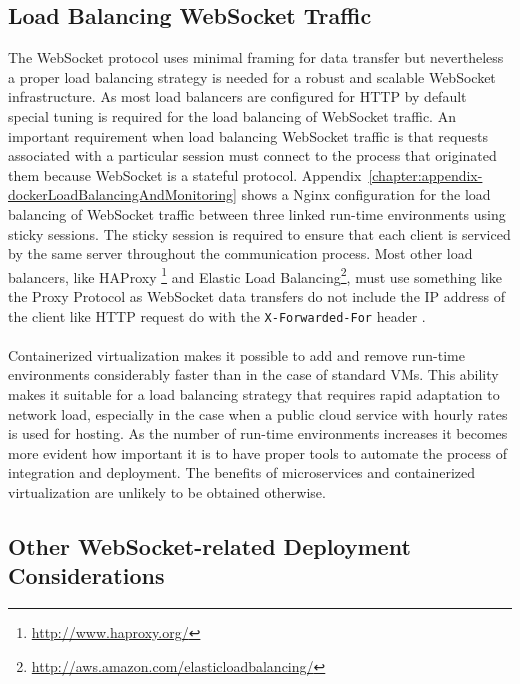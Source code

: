 \subsection{Load Balancing WebSocket Traffic}

The WebSocket protocol uses minimal framing for data transfer but nevertheless a proper load balancing strategy is needed for a robust and scalable WebSocket infrastructure. As most load balancers are configured for HTTP by default special tuning is required for the load balancing of WebSocket traffic. An important requirement when load balancing WebSocket traffic is that requests associated with a particular session must connect to the process that originated them because WebSocket is a stateful protocol. Appendix~\ref{chapter:appendix-dockerLoadBalancingAndMonitoring} shows a Nginx configuration for the load balancing of WebSocket traffic between three linked run-time environments using sticky sessions. The sticky session is required to ensure that each client is serviced by the same server throughout the communication process. Most other load balancers, like HAProxy \footnote{\url{http://www.haproxy.org/}} and Elastic Load Balancing\footnote{\url{http://aws.amazon.com/elasticloadbalancing/}}, must use something like the Proxy Protocol as WebSocket data transfers do not include the IP address of the client like HTTP request do with the \texttt{X-Forwarded-For} header \cite{modard2015websocket}.
\\ \\
Containerized virtualization makes it possible to add and remove run-time environments considerably faster than in the case of standard VMs. This ability makes it suitable for a load balancing strategy that requires rapid adaptation to network load, especially in the case when a public cloud service with hourly rates is used for hosting. As the number of run-time environments increases it becomes more evident how important it is to have proper tools to automate the process of integration and deployment. The benefits of microservices and containerized virtualization are unlikely to be obtained otherwise.

\subsection{Other WebSocket-related Deployment Considerations}

